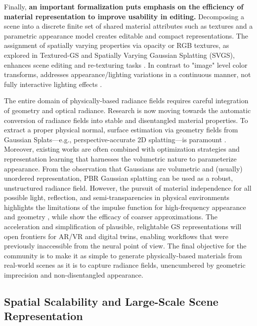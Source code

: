 \documentclass[11pt,a4paper]{article}
\begin{document}
Finally, \textbf{an important formalization puts emphasis on the efficiency of material representation to improve usability in editing.} Decomposing a scene into a discrete finite set of shared material attributes such as textures and a parametric appearance model creates editable and compact representations. The assignment of spatially varying properties via opacity or RGB textures, as explored in Textured-GS and Spatially Varying Gaussian Splatting (SVGS), enhances scene editing and re-texturing tasks \cite{arxiv:2407.09733v2,arxiv:2411.18966v2}. In contrast to "image" level color transforms, \cite{arxiv:2501.10788v1} addresses appearance/lighting variations in a continuous manner, not fully interactive lighting effects \cite{arxiv:2501.10788v1}.

The entire domain of physically-based radiance fields requires careful integration of geometry and optical radiance. Research is now moving towards the automatic conversion of radiance fields into stable and disentangled material properties. To extract a proper physical normal, surface estimation via geometry fields from Gaussian Splats---e.g., perspective-accurate 2D splatting---is paramount \cite{arxiv:2403.17888v1}. Moreover, existing works are often combined with optimization strategies and representation learning that harnesses the volumetric nature to parameterize appearance. From the observation that Gaussians are volumetric and (usually) unordered representation, PBR Gaussian splatting can be used as a robust, unstructured radiance field. However, the pursuit of material independence for all possible light, reflection, and semi-transparencies in physical environments highlights the limitations of the impulse function for high-frequency appearance and geometry \cite{arxiv:1407.0039v1,arxiv:2605.15010v2}, while \cite{arxiv:2412.01931v1,arxiv:2507.11321v1,arxiv:2603.18707v1} show the efficacy of coarser approximations. The acceleration and simplification of plausible, relightable GS representations will open frontiers for AR/VR and digital twins, enabling workflows that were previously inaccessible from the neural point of view. The final objective for the community is to make it as simple to generate physically-based materials from real-world scenes as it is to capture radiance fields, unencumbered by geometric imprecision and non-disentangled appearance.


\subsection{Spatial Scalability and Large-Scale Scene Representation}
\end{document}
